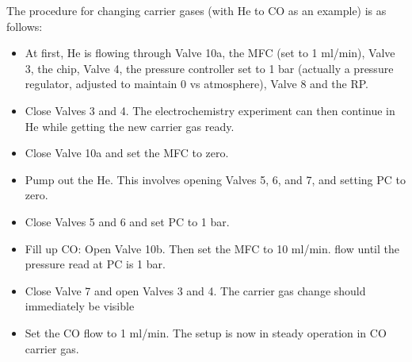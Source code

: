 The procedure for changing carrier gases (with He to CO as an example) is as follows:
\begin{itemize}
	\item At first, He is flowing through Valve 10a, the MFC (set to 1 ml/min), Valve 3, the chip, Valve 4, the pressure controller set to 1 bar (actually a pressure regulator, adjusted to maintain 0 vs atmosphere), Valve 8 and the RP. 
	
	\item Close Valves 3 and 4. The electrochemistry experiment can then continue in He while getting the new carrier gas ready.
	
	\item Close Valve 10a and set the MFC to zero.
	
	\item Pump out the He. This involves opening Valves 5, 6, and 7, and setting PC to zero.
	
	\item Close Valves 5 and 6 and set PC to 1 bar.
	
	\item Fill up CO: Open Valve 10b. Then set the MFC to 10 ml/min. flow until the pressure read at PC is 1 bar.
	
	\item Close Valve 7 and open Valves 3 and 4. The carrier gas change should immediately be visible 
	
	\item Set the CO flow to 1 ml/min. The setup is now in steady operation in CO carrier gas.
\end{itemize}